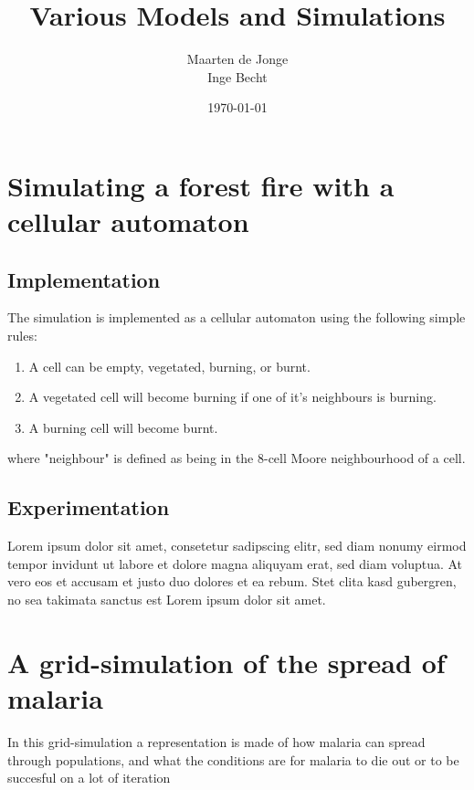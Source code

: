 \documentclass[a4paper]{report}
\author{Maarten de Jonge \\
        Inge Becht}
\date{\today}
\title{Various Models and Simulations}
\begin{document}
\maketitle

\chapter{Simulating a forest fire with a cellular automaton}
\label{cha:ff}

\section{Implementation} 
\label{sec:ff_impl}

The simulation is implemented as a cellular automaton using the following simple
rules:
\begin{enumerate}
    \item A cell can be empty, vegetated, burning, or burnt.
    \item A vegetated cell will become burning if one of it's neighbours is
          burning.
    \item A burning cell will become burnt.
\end{enumerate}
where "neighbour" is defined as being in the 8-cell Moore neighbourhood of a
cell.


\section{Experimentation} 
\label{sec:ff_exp}

Lorem ipsum dolor sit amet, consetetur sadipscing elitr, sed diam nonumy eirmod
tempor invidunt ut labore et dolore magna aliquyam erat, sed diam voluptua. At
vero eos et accusam et justo duo dolores et ea rebum. Stet clita kasd gubergren,
no sea takimata sanctus est Lorem ipsum dolor sit amet.



\chapter{A grid-simulation of the spread of malaria}
\label{cha:mlaria}


In this grid-simulation a representation is made of how malaria can spread
through populations, and what the conditions are for malaria to die out or to
be succesful on a lot of iteration
\end{document}

